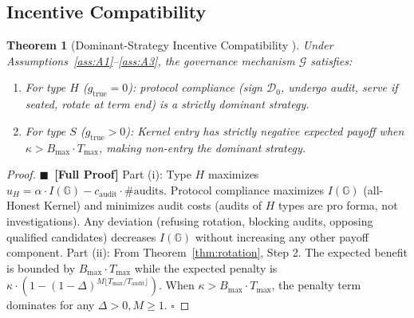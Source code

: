 \documentclass[12pt,a4paper]{article}
\newtheorem{theorem}{Theorem}[section]
\theoremstyle{definition}
\newcommand{\rigorFull}[0]{$\blacksquare$~\textbf{[Full Proof]}}
\newcommand{\Community}{\mathbb{G}}
\newcommand{\GzeroDecl}{\mathcal{D}_{0}}
\begin{document}
\subsection{Incentive Compatibility}
\begin{theorem}[Dominant-Strategy Incentive Compatibility ]
\label{thm:incentive_compat}
Under Assumptions~\ref{ass:A1}--\ref{ass:A3}, the governance mechanism $\mathcal{G}$ satisfies:
\begin{enumerate}[label=(\roman*)]
    \item For type $H$ ($g_{\mathrm{true}} = 0$): protocol compliance (sign $\GzeroDecl$, undergo audit, serve if seated, rotate at term end) is a strictly dominant strategy.
    \item For type $S$ ($g_{\mathrm{true}} > 0$): Kernel entry has strictly negative expected payoff when $\kappa > B_{\max} \cdot T_{\max}$, making non-entry the dominant strategy.
\end{enumerate}
\end{theorem}
\begin{proof}\rigorFull
Part (i): Type $H$ maximizes $u_H = \alpha \cdot I(\Community) - c_{\text{audit}} \cdot \text{\#audits}$. Protocol compliance maximizes $I(\Community)$ (all-Honest Kernel) and minimizes audit costs (audits of $H$ types are pro forma, not investigations). Any deviation (refusing rotation, blocking audits, opposing qualified candidates) decreases $I(\Community)$ without increasing any other payoff component.
Part (ii): From Theorem~\ref{thm:rotation}, Step 2. The expected benefit is bounded by $B_{\max} \cdot T_{\max}$ while the expected penalty is $\kappa \cdot (1 - (1 - \Delta)^{M \lfloor T_{\max}/T_{\text{audit}} \rfloor})$. When $\kappa > B_{\max} \cdot T_{\max}$, the penalty term dominates for any $\Delta > 0, M \geq 1$. $\square$
\end{proof}
\end{document}
